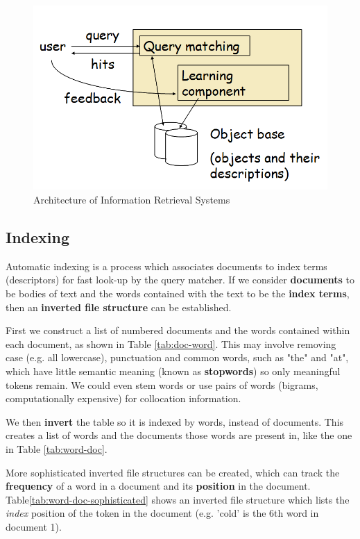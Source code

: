 \documentclass{article}
\begin{document}
\begin{figure}
	\centering
	\includegraphics[scale=0.4]{figures/ir-system-architecture.png}
	\caption{Architecture of Information Retrieval Systems}
	\label{fig:ir-architecture}
\end{figure}

\subsection{Indexing}

Automatic indexing is a process which associates documents to index terms (descriptors) for fast look-up by the query matcher. If we consider \textbf{documents} to be bodies of text and the words contained with the text to be the \textbf{index terms}, then an \textbf{inverted file structure} can be established.

First we construct a list of numbered documents and the words contained within each document, as shown in Table \ref{tab:doc-word}. This may involve removing case (e.g. all lowercase), punctuation and common words, such as "the" and "at", which have little semantic meaning (known as \textbf{stopwords}) so only meaningful tokens remain. We could even stem words or use pairs of words (bigrams, computationally expensive) for collocation information.

We then \textbf{invert} the table so it is indexed by words, instead of documents. This creates a list of words and the documents those words are present in, like the one in Table \ref{tab:word-doc}.

More sophisticated inverted file structures can be created, which can track the \textbf{frequency} of a word in a document and its \textbf{position} in the document. Table\ref{tab:word-doc-sophisticated} shows an inverted file structure which lists the \textit{index} position of the token in the document (e.g. 'cold' is the 6th word in document 1).
\end{document}
